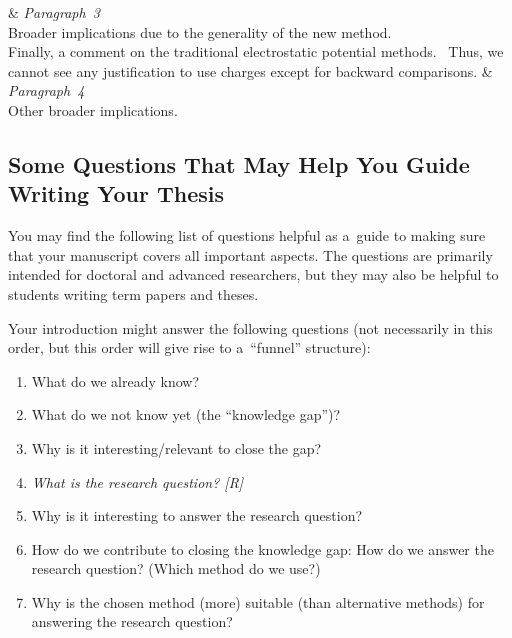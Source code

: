 \documentclass[11pt, a4paper, oneside]{article}
\newlength{\smalllinespacing}
\renewcommand{\caps}[1]{{\textscale{0.97}{\textls[50]{\MakeUppercase{#1}}}}}
\theoremstyle{Plain}
\theoremstyle{Definition}
\theoremstyle{Remark}
\begin{document}
\begin{longtblr}{}
	&
	{%
		\textit{Paragraph~3} \\
		Broader implications due to the generality of the new method.
	}
	\\
	\hspace{\smalllinespacing}Finally, a comment on the traditional electrostatic potential methods. \textellipsis\ Thus, we cannot see any justification to use \caps{CHELP} charges except for backward comparisons.
	&
	{%
		\textit{Paragraph~4} \\
		Other broader implications.
	}
\end{longtblr}

\endgroup

\subsection{Some Questions That May Help You Guide Writing Your Thesis}

You may find the following list of questions helpful as a~guide to making sure that your manu\-script covers all important aspects. The questions are primarily intended for doctoral and advanced researchers, but they may also be helpful to students writing term papers and theses.

Your introduction might answer the following questions (not necessarily in this order, but this order will give rise to a~``funnel'' structure):
\begin{enumerate}[labelindent = \parindent, leftmargin = 2\parindent]
	\item What do we already know?
	\item What do we not know yet (the ``knowledge gap'')?
	\item Why is it interesting\slash relevant to close the gap?
	\item \emph{What is the research question? [R]}
	\item Why is it interesting to answer the research question?
	\item How do we contribute to closing the knowledge gap: How do we answer the research question? (Which method do we use?)
	\item Why is the chosen method (more) suitable (than alternative methods) for answering the research question?
\end{enumerate}
\end{document}
